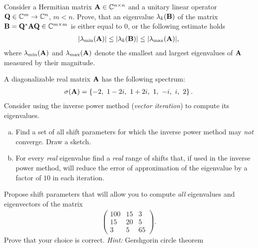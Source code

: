 
\begin{Sheet}
  \label{sheet3}

  \begin{Problem}
    Consider a Hermitian matrix $\mathbf A\in\mathbb C^{n\times n}$ and a unitary
    linear operator $\mathbf Q\in\mathbb C^m\to\mathbb C^n$, $m<n$. Prove, that an
    eigenvalue $\lambda_k(\mathbf B)$ of the matrix
    $\mathbf B=\mathbf Q^*\mathbf A\mathbf Q\in\mathbb C^{m\times m}$ is either equal to 0,
    or the following estimate holds
    \begin{gather*}
      \lvert\lambda_{\min}(\mathbf A)\rvert
      \leq \lvert\lambda_{k}(\mathbf B)\rvert
      \leq \lvert\lambda_{\max}(\mathbf A)\rvert,
    \end{gather*}
    where $\lambda_{\min}(\mathbf A)$ and $\lambda_{\max}(\mathbf A)$ denote
    the smallest and largest eigenvalues of $\mathbf A$ measured by their
    magnitude.
  \end{Problem}

  \begin{Problem}
    A diagonalizable real matrix $\mathbf A$ has the following spectrum:
    \begin{gather*}
      \sigma(\mathbf A) = \left\{-2,\ 1-2i,\ 1+2i,\ 1,\ -i,\ i,\ 2\right\}.
    \end{gather*}
    Consider using the inverse power method (\textit{vector
      iteration}) to compute its eigenvalues.
    \begin{enumerate}[(a)]
    \item Find a set of all shift parameters for which the inverse
      power method may \textit{not} converge. Draw a sketch.
    \item For every \textit{real} eigenvalue find a \textit{real}
      range of shifts that, if used in the inverse power method, will
      reduce the error of approximation of the eigenvalue by a factor
      of $10$ in each iteration.
    \end{enumerate}
  \end{Problem}

  \begin{Problem}
    \label{problem:shift}
    Propose shift parameters that will allow you to compute
    \textit{all} eigenvalues and eigenvectors of the matrix
    \begin{gather*}
      \begin{pmatrix}
        100 & 15 & 3 \\
         15 & 20 & 5 \\
          3 &  5 & 65
      \end{pmatrix}
      .
    \end{gather*}
    Prove that your choice is correct.  \textit{Hint:} Gershgorin
    circle theorem
  \end{Problem}


\end{Sheet}
